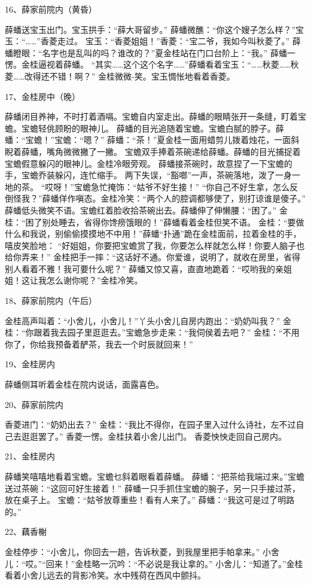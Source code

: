 16、薛家前院内（黄昏）\par
薛蟠送宝玉出门。宝玉拱手：“薛大哥留步。”
薛蟠微醮：“你这个嫂子怎么样？”宝玉：“……”香菱走过。
宝玉：“香菱姐姐！”香菱：“宝二爷，我如今叫秋菱了。”
薛蟠瞪眼：“名字也是乱叫的吗？谁改的？”夏金桂站在门口台阶上：“我。”
薛蟠一愣。金桂逼视着薛蟠。
“其实……这个这个名字……”薛蟠看着宝玉：“……秋菱……秋菱……改得还不错！啊？”
金桂微微-笑。宝玉惆怅地看着香菱。 

17、金桂房中（晚）\par
薛蟠闭目养神，不时打着酒嗝。宝蟾自内室走出。薛蟠的眼睛张开一条缝，盯着宝蟾。宝蟾轻佻顾盼的眼神儿。 薛蟠的目光追随着宝蟾。宝蟾白腻的脖子。薛蟠：“宝蟾！”宝蟾：“嗯？”
薛蟠：“茶！”夏金桂一面用蜡剪儿拨着烛花，一面斜睨着薛蟠，嘴角微微撇了一撇。
宝蟾双手捧着茶碗递给薛蟠。薛蟠的目光捕捉着宝蟾假意躲闪的眼神儿。金桂冷眼旁观。
薛蟠接茶碗时，故意捏了一下宝蟾的手，宝蟾乔装躲闪，连忙缩手。
两下失误，“豁啷”一声，茶碗落地，泼了一身一地的茶。
“哎呀！”宝蟾急忙掩饰：“姑爷不好生接！”
“你自己不好生拿，怎么反倒怪我？”薛蟠佯作嗔态。金桂冷笑：“两个人的腔调都够使了，别打谅谁是傻子。”
薛蟠低头微笑不语。宝蟾红着脸收拾茶碗出去。薛蟠伸了伸懒腰：“困了。”
金桂：“困了别处睡去，省得你馋痨饿眼的！”薛蟠看着金桂但笑不语。
金桂：“要做什么和我说，别偷偷摸摸地不中用！”薛蟠“扑通”跪在金桂面前，拉着金桂的手，嘻皮笑脸地：
“好姐姐，你要把宝蟾赏了我，你要怎么样就怎么样！你要人脑子也给你弄来！”
金桂把手一摔：“这话好不通。你爱谁，说明了，就收在房里，省得别人看着不雅！我可要什么呢？”
薛蟠又惊又喜，直直地跪着：“哎哟我的亲姐姐！这让我怎么谢你呢？”金桂冷笑。

18、薛家前院内（午后）\par
金桂高声叫着：“小舍儿，小舍儿！”丫头小舍儿自房内跑出：“奶奶叫我？”
金桂：“你跟着我去园子里逛逛去。”宝蟾急步走来：“我伺侯着去吧？”
金桂：“不用你了，你给我预备着酽茶，我去一个时辰就回来！”

19、金桂房内\par
薛蟠侧耳听着金桂在院内说话，面露喜色。

20、薛家前院内\par
香菱进门：“奶奶出去？”
金桂：“我比不得你，在园子里入过什么诗社，左不过自己去逛逛罢了。”
香菱一愣。金桂扶着小舍儿出门。
香菱怏怏走回自己房内。

21、金桂房内\par
薛蟠笑嘻嘻地看着宝蟾。宝蟾乜斜着眼看着薛蟠。
薛蟠：“把茶给我端过来。”宝蟾送过茶碗：“这回可好生接着！”
薛蟠一只手抓住宝蟾的腕子，另一只手接过茶，放在桌子上。
宝蟾：“姑爷放尊重些！看有人来了。”
薛蟠：“我这可是过了明路的。” 

22、藕香榭\par
金桂停步：“小舍儿，你回去一趟，告诉秋菱，到我屋里把手帕拿来。”
小舍儿：“哎。”“回来！”金桂略一沉吟：“不必说是我让拿的。”
小舍儿：“知道了。”金桂看着小舍儿远去的背影冷笑。水中残荷在西风中颤抖。

